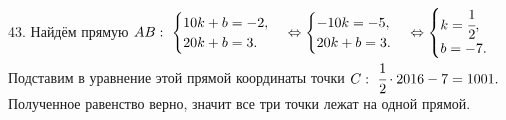 43. Найдём прямую $AB:\ \begin{cases} 10k+b=-2,\\ 20k+b=3.\end{cases}\Leftrightarrow\begin{cases} -10k=-5,\\ 20k+b=3.\end{cases}
\Leftrightarrow\begin{cases} k=\cfrac{1}{2},\\ b=-7.\end{cases}$ Подставим в уравнение этой прямой координаты точки $C:\ \cfrac{1}{2}\cdot2016-7=1001.$ Полученное равенство верно, значит все три точки лежат на одной прямой.\\
